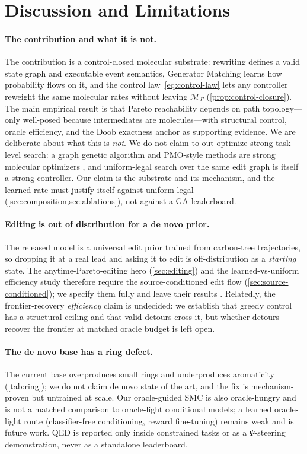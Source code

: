 \documentclass{article}
\newcommand{\M}{\mathcal{M}_{\Gamma}}
\theoremstyle{definition}
\theoremstyle{remark}
\begin{document}
\section{Discussion and Limitations}
\label{sec:limits}

\paragraph{The contribution and what it is not.}
The contribution is a control-closed molecular substrate: rewriting defines a valid state graph and executable event semantics, Generator Matching learns how probability flows on it, and the control law~\eqref{eq:control-law} lets any controller reweight the same molecular rates without leaving $\M$ (\cref{prop:control-closure}). The main empirical result is that Pareto reachability depends on path topology---only well-posed because intermediates are molecules---with structural control, oracle efficiency, and the Doob exactness anchor as supporting evidence. We are deliberate about what this is \emph{not}. We do not claim to out-optimize strong task-level search: a graph genetic algorithm and PMO-style methods are strong molecular optimizers \citep{jensen2019graphga,gao2022pmo}, and uniform-legal search over the same edit graph is itself a strong controller. Our claim is the substrate and its mechanism, and the learned rate must justify itself against uniform-legal (\cref{sec:composition,sec:ablations}), not against a GA leaderboard.

\paragraph{Editing is out of distribution for a de novo prior.}
The released model is a universal edit prior trained from carbon-tree trajectories, so dropping it at a real lead and asking it to edit is off-distribution as a \emph{starting} state. The anytime-Pareto-editing hero (\cref{sec:editing}) and the learned-vs-uniform efficiency study therefore require the source-conditioned edit flow (\cref{sec:source-conditioned}); we specify them fully and leave their results \XXX. Relatedly, the frontier-recovery \emph{efficiency} claim is undecided: we establish that greedy control has a structural ceiling and that valid detours cross it, but whether detours recover the frontier at matched oracle budget is left open.

\paragraph{The de novo base has a ring defect.}
The current base overproduces small rings and underproduces aromaticity (\cref{tab:ring}); we do not claim de novo state of the art, and the fix is mechanism-proven but untrained at scale. Our oracle-guided SMC is also oracle-hungry and is not a matched comparison to oracle-light conditional models; a learned oracle-light route (classifier-free conditioning, reward fine-tuning) remains weak and is future work. QED is reported only inside constrained tasks or as a $\Psi$-steering demonstration, never as a standalone leaderboard.
\end{document}
